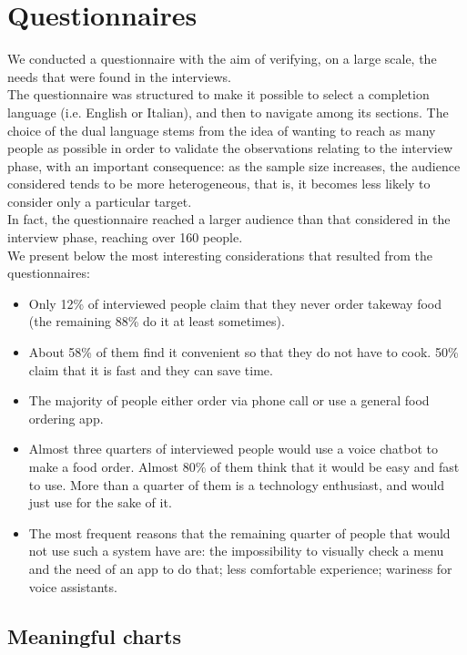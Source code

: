 \section{Questionnaires}

We conducted a questionnaire with the aim of verifying, on a large scale,
the needs that were found in the interviews.\\
The questionnaire was structured to make it possible to select a completion
language (i.e. English or Italian), and then to navigate among its sections.
The choice of the dual language stems from the idea of wanting to reach as
many people as possible in order to validate the observations relating to the
interview phase, with an important consequence: as the sample size increases,
the audience considered tends to be more heterogeneous, that is,
it becomes less likely to consider only a particular target.\\
In fact, the questionnaire reached a larger audience than that
considered in the interview phase, reaching over 160 people.\\
We present below the most interesting considerations that resulted
from the questionnaires:\\

\begin{itemize}
    \item Only 12\% of interviewed people claim that they never order takeway food
    (the remaining 88\% do it at least sometimes).
    \item About 58\% of them find it convenient so that they do not have to cook. 50\%
    claim that it is fast and they can save time.
    \item The majority of people either order via phone call or use a general food ordering
    app.
    \item Almost three quarters of interviewed people  would use a voice chatbot to make
    a food order. Almost 80\% of them think that it would be easy and fast to use. More
    than a quarter of them is a technology enthusiast, and would just use for the
    sake of it.
    \item The most frequent reasons that the remaining quarter of people that would not
    use such a system have are: the impossibility to visually check a menu and the need
    of an app to do that; less comfortable experience; wariness for voice assistants.
\end{itemize}


\subsection{Meaningful charts}

